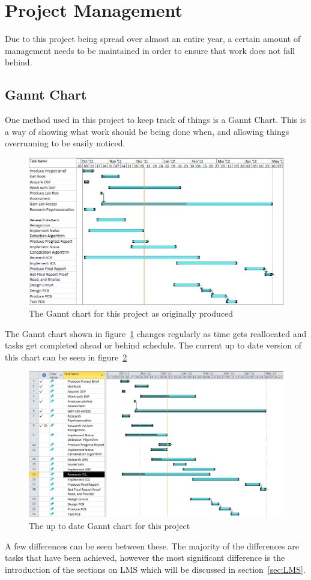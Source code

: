 \section{Project Management}
Due to this project being spread over almost an entire year, a certain amount of management needs to be maintained in order to ensure that work does not fall behind.

\subsection{Gannt Chart}
One method used in this project to keep track of things is a Gannt Chart.
This is a way of showing what work should be being done when, and allowing things overrunning to be easily noticed.

\begin{figure}[h]
	\centering
	\includegraphics[width=\textwidth]{./img/ganntori.png}
	\caption{The Gannt chart for this project as originally produced}
	\label{fig:gannt}
\end{figure}
\noindent
The Gannt chart shown in figure~\ref{fig:gannt} changes regularly as time gets reallocated and tasks get completed ahead or behind schedule.
The current up to date version of this chart can be seen in figure~\ref{fig:newgannt}

\begin{figure}[H]
	\centering
	\includegraphics[width=\textwidth]{./img/ganntnew.png}
	\caption{The up to date Gannt chart for this project}
	\label{fig:newgannt}
\end{figure}
\noindent
A few differences can be seen between these.
The majority of the differences are tasks that have been achieved, however the most significant difference is the introduction of the sections on LMS which will be discussed in section~\ref{sec:LMS}.

